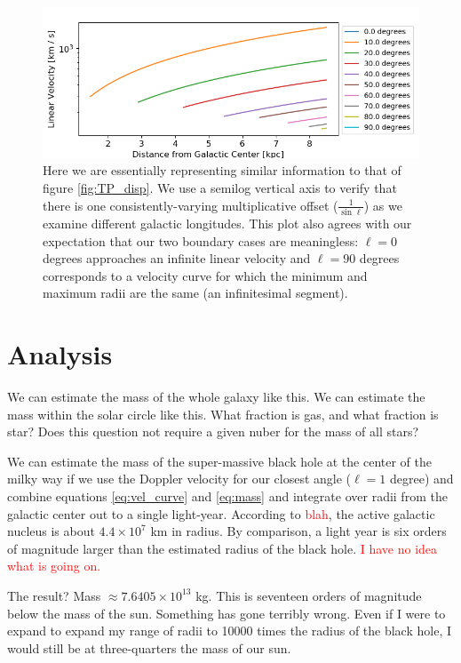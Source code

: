 \documentclass[12pt]{article}
\begin{document}
\begin{figure}
	\centering
	\includegraphics[width=.9\linewidth]{tangentPoint_selected_dispersions}
	\caption{Here we are essentially representing similar information to that of figure \ref{fig:TP_disp}. We use a semilog vertical axis to verify that there is one consistently-varying multiplicative offset ($\frac{1}{\sin \ell}$) as we examine different galactic longitudes. This plot also agrees with our expectation that our two boundary cases are meaningless: $\ell = 0$ degrees approaches an infinite linear velocity and $\ell = 90$ degrees corresponds to a velocity curve for which the minimum and maximum radii are the same (an infinitesimal segment).}
	\label{fig:TP_sel_disp}
\end{figure}

\section{Analysis}

\quad \quad We can estimate the mass of the whole galaxy like this. We can estimate the mass within the solar circle like this. What fraction is gas, and what fraction is star? Does this question not require a given nuber for the mass of all stars?

We can estimate the mass of the super-massive black hole at the center of the milky way if we use the Doppler velocity for our closest angle ($\ell = 1$ degree) and combine equations \ref{eq:vel_curve} and \ref{eq:mass} and integrate over radii from the galactic center out to a single light-year. According to \textcolor{red}{blah}, the active galactic nucleus is about $4.4 \times 10^{7}$ km in radius. By comparison, a light year is six orders of magnitude larger than the estimated radius of the black hole. \textcolor{red}{I have no idea what is going on.}

The result? Mass $\approx 7.6405 \times 10^{13}$ kg. This is seventeen orders of magnitude below the mass of the sun. Something has gone terribly wrong. Even if I were to expand to expand my range of radii to 10000 times the radius of the black hole, I would still be at three-quarters the mass of our sun. 
\end{document}
